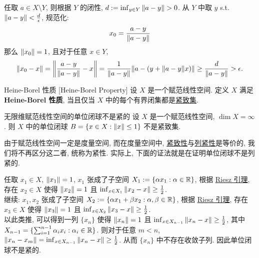         \begin{prf}
            任取 \(a\in X\setminus Y\), 则根据 \(Y\) 的闭性, \(d:=\inf_{y\in Y}\norm{a-y}>0\). 从 \(Y\) 中取 \(y\) s.t. \(\norm{a-y}<\frac{d}{\epsilon}\), 规范化:
            \[x_0=\frac{a-y}{\norm{a-y}}\]
            那么 \(\norm{x_0}=1\), 且对于任意 \(x\in Y\),
            \[\norm{x_0-x}=\norm{\frac{a-y}{\norm{a-y}}-x}=\frac{1}{\norm{a-y}}\norm{a-(y+\norm{a-y}x)}\geq\frac{d}{\norm{a-y}}>\epsilon.\]
        \end{prf}

        \begin{dfn}
            {Heine-Borel 性质}
            [Heine-Borel Property]
            设 \(X\) 是一个赋范线性空间. 定义 \(X\) 满足\textbf{Heine-Borel 性质}, 当且仅当 \(X\) 中的每个有界闭集都是\hyperref[dfn:compact]{紧致集}.
        \end{dfn}

        \begin{thm}
            [riesz-2]
            {无限维赋范线性空间的单位闭球不是紧的}
            设 \(X\) 是一个赋范线性空间, \(\dim X=\infty\). 则 \(X\) 中的单位闭球 \(B=\{x\in X:\norm{x}\leq 1\}\) 不是紧致集.
        \end{thm}

        \begin{rmk}
            [Dedicatia]
            由于赋范线性空间一定是度量空间, 而在度量空间中, \hyperref[dfn:compact]{紧致性}与\hyperref[dfn:sequential-compact]{列紧性}是等价的, 我们将不再区分这二者, 统称为紧性. 实际上, 下面的证法就是在证明单位闭球不是列紧的.
        \end{rmk}

        \begin{prf}
            任取 \(x_1\in X\), \(\norm{x_1}=1\), \(x_1\) 张成了子空间 \(X_1:=\{\alpha x_1: \alpha \in \operatorname{\mathbb{R}}\}\), 根据 \hyperref[thm:riesz]{Riesz 引理}, 存在 \(x_2\in X\) 使得 \(\norm{x_2}=1\) 且 \(\inf_{x\in X_1}\norm{x_2-x}\geq\frac{1}{2}\). \\
            继续: \(x_1, x_2\) 张成了子空间 \(X_2:=\{\alpha x_1+\beta x_2: \alpha, \beta \in \operatorname{\mathbb{R}}\}\), 根据 \hyperref[thm:riesz]{Riesz 引理}, 存在 \(x_3\in X\) 使得 \(\norm{x_3}=1\) 且 \(\inf_{x\in X_2}\norm{x_3-x}\geq\frac{1}{2}\). \\
            以此类推, 可以得到一列 \(\{x_n\}\) 使得 \(\norm{x_n}=1\) 且 \(\inf_{x\in X_{n-1}}\norm{x_n-x}\geq\frac{1}{2}\), 其中 \(X_{n-1}=\{\sum_{i=1}^{n-1}\alpha_i x_i: \alpha_i \in \operatorname{\mathbb{R}}\}\). 则对于任意 \(m<n\), \(\norm{x_n-x_m}=\inf_{x\in X_{n-1}}\norm{x_n-x}\geq\frac{1}{2}\). 从而 \(\{x_n\}\) 中不存在收敛子列. 因此单位闭球不是紧的.
        \end{prf}

